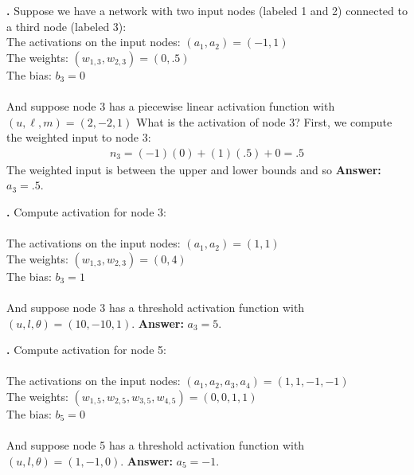 \noindent
{\bf \theActFunctionCounter.} Suppose we have a network with 
two input nodes (labeled 1 and 2) connected to a third node (labeled 3): \\
\indent \qquad\qquad The activations on the input nodes: $(a_1,a_2) = (-1,1)$\\
\indent \qquad\qquad The weights: $(w_{1,3}, w_{2,3}) = (0,.5)$ \\
\indent \qquad\qquad The bias: $b_3 = 0$ \\ \\
And suppose node 3 has a piecewise linear activation function with $(u,\ell,m) = (2,-2,1)$ What is the 
activation of node 3?  First, we compute the weighted input to node 3:
\begin{eqnarray*}
n_3 =  (-1)(0)        +     (1)(.5)       + 0 = .5
\end{eqnarray*}
The weighted input is between the upper and lower bounds and so
{\bf Answer:}  $a_3=.5$.

\bigskip

\noindent
{\bf \theActFunctionCounter.} Compute activation for node 3: \\ \\
\indent \qquad\qquad The activations on the input nodes: $(a_1,a_2) = (1,1)$\\
\indent \qquad\qquad The weights: $(w_{1,3}, w_{2,3}) = (0,4)$ \\
\indent \qquad\qquad The bias: $b_3 = 1$ \\ \\
And suppose node 3 has a threshold activation function with $(u,l,\theta) = (10,-10,1)$.
{\bf Answer:}  $a_3=5$.

\bigskip

\noindent
{\bf \theActFunctionCounter.} Compute activation for node 5: \\ \\
\indent \qquad\qquad The activations on the input nodes: $(a_1,a_2, a_3, a_4) = (1,1,-1,-1)$\\
\indent \qquad\qquad The weights: $(w_{1,5}, w_{2,5}, w_{3,5}, w_{4,5}) = (0,0,1,1)$ \\
\indent \qquad\qquad The bias: $b_5 = 0$ \\ \\
And suppose node 5 has a threshold activation function with $(u,l,\theta) = (1,-1,0)$.
{\bf Answer:}  $a_5=-1$.

\bigskip


